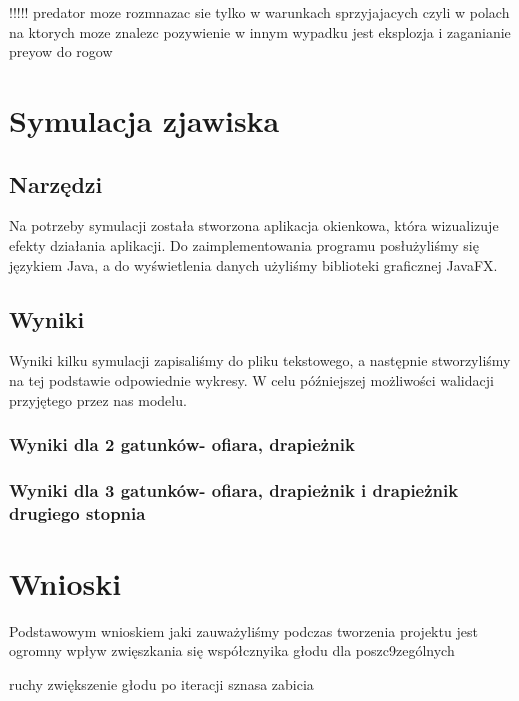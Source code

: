 !!!!!
predator moze rozmnazac sie tylko w warunkach sprzyjajacych
czyli w polach na ktorych moze znalezc pozywienie
w innym wypadku jest eksplozja
i zaganianie preyow do rogow

\section{Symulacja zjawiska}

\subsection{Narzędzi}
Na potrzeby symulacji została stworzona aplikacja okienkowa, która wizualizuje efekty działania aplikacji.
Do zaimplementowania programu posłużyliśmy się językiem Java, a do wyświetlenia danych użyliśmy biblioteki graficznej JavaFX.

\subsection{Wyniki}

Wyniki kilku symulacji zapisaliśmy do pliku tekstowego, a następnie stworzyliśmy na tej podstawie odpowiednie wykresy. W celu późniejszej możliwości walidacji przyjętego przez nas modelu.

\subsubsection{Wyniki dla 2 gatunków- ofiara, drapieżnik}


\subsubsection{Wyniki dla 3 gatunków- ofiara, drapieżnik i drapieżnik drugiego stopnia}




\section{Wnioski}

Podstawowym wnioskiem jaki zauważyliśmy podczas tworzenia projektu jest ogromny wpływ zwięszkania się współcznyika głodu dla poszc9zególnych 

ruchy zwiększenie głodu po iteracji sznasa zabicia


